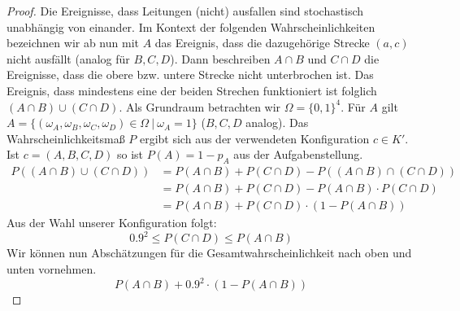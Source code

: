 \documentclass[a4paper]{scrartcl}
\begin{document}
\begin{enumerate}[label=\bfseries\arabic*.]
\begin{proof}
                    Die Ereignisse, dass Leitungen (nicht) ausfallen sind
                    stochastisch unabhängig von einander.
                    Im Kontext der folgenden Wahrscheinlichkeiten bezeichnen wir ab nun mit $A$
                    das Ereignis, dass die dazugehörige Strecke $(a, c)$ nicht
                    ausfällt (analog für $B, C, D$). 
                    Dann beschreiben $A \cap B$ und $C \cap D$ die Ereignisse,
                    dass die obere bzw. untere Strecke nicht unterbrochen ist.
                    Das Ereignis, dass mindestens eine der beiden Strechen
                    funktioniert ist folglich $(A \cap B) \cup (C \cap D)$.
                    Als Grundraum betrachten wir $\Omega = \{0, 1\}^4$.
                    Für $A$ gilt $A = \{(\omega_A, \omega_B, \omega_C, \omega_D)
                    \in \Omega \ |\ \omega_A = 1\}$ ($B, C, D$ analog).
                    Das Wahrscheinlichkeitsmaß $P$ ergibt sich aus der
                    verwendeten Konfiguration $c \in K'$.
                    Ist $c = (A, B, C, D)$ so ist $P(A) = 1 - p_A$ aus der
                    Aufgabenstellung.
                    \begin{equation*}
                        \begin{split}
                            P((A \cap B) \cup (C \cap D))
                            &= P(A \cap B) + P(C \cap D)
                               - P((A \cap B) \cap (C \cap D)) \\
                            &= P(A \cap B) + P(C \cap D)
                               - P(A \cap B) \cdot P(C \cap D) \\
                            &= P(A \cap B) + P(C \cap D)
                               \cdot (1 - P(A \cap B))
                       \end{split}
                    \end{equation*}
                    Aus der Wahl unserer Konfiguration folgt:
                    \begin{equation*}
                        \num{0.9}^2 \leq P(C \cap D) \leq P(A \cap B)
                    \end{equation*}
                    Wir können nun Abschätzungen für die
                    Gesamtwahrscheinlichkeit nach oben und unten vornehmen.
                    \begin{equation*}
                        P(A \cap B) + \num{0,9}^2 \cdot (1 - P(A \cap B))

\end{equation*}
\end{proof}
\end{enumerate}
\end{document}
